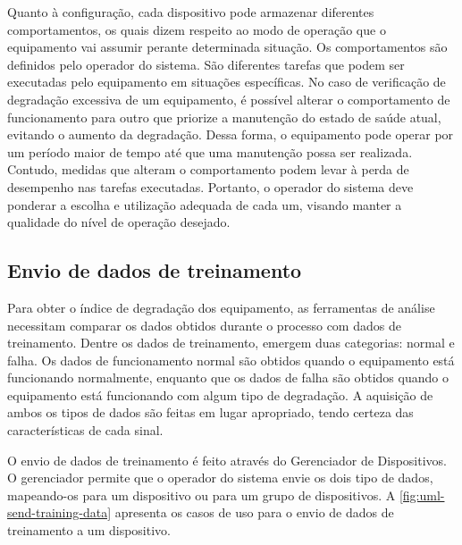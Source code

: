 
Quanto à configuração, cada dispositivo pode armazenar diferentes comportamentos, os quais dizem
respeito ao modo de operação que o equipamento vai assumir perante determinada situação. Os
comportamentos são definidos pelo operador do sistema. São diferentes tarefas que podem ser
executadas pelo equipamento em situações específicas. No caso de verificação de degradação excessiva
de um equipamento, é possível alterar o comportamento de funcionamento para outro que priorize a
manutenção do estado de saúde atual, evitando o aumento da degradação. Dessa forma, o equipamento
pode operar por um período maior de tempo até que uma manutenção possa ser realizada. Contudo,
medidas que alteram o comportamento podem levar à perda de desempenho nas tarefas executadas.
Portanto, o operador do sistema deve ponderar a escolha e utilização adequada de cada um, visando
manter a qualidade do nível de operação desejado.

%


\subsection{Envio de dados de treinamento}

Para obter o índice de degradação dos equipamento, as ferramentas de análise necessitam comparar os
dados obtidos durante o processo com dados de treinamento. Dentre os dados de treinamento, emergem
duas categorias: normal e falha. Os dados de funcionamento normal são obtidos quando o equipamento
está funcionando normalmente, enquanto que os dados de falha são obtidos quando o equipamento está
funcionando com algum tipo de degradação. A aquisição de ambos os tipos de dados são feitas em lugar
apropriado, tendo certeza das características de cada sinal.

O envio de dados de treinamento é feito através do Gerenciador de Dispositivos. O gerenciador
permite que o operador do sistema envie os dois tipo de dados, mapeando-os para um dispositivo ou
para um grupo de dispositivos. A \cref{fig:uml-send-training-data} apresenta os casos de uso para o
envio de dados de treinamento a um dispositivo.

